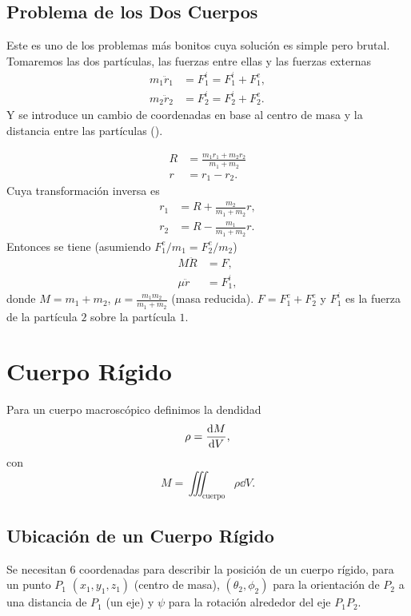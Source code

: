 \section{Problema de los Dos Cuerpos}
Este es uno de los problemas más bonitos cuya solución es simple pero brutal. Tomaremos las dos partículas, las fuerzas entre ellas y las fuerzas externas
\begin{align*}
    m_1 \ddot{r} _1 &= F_1 ^i = F_1 ^i + F_1 ^e, \\
    m_2 \ddot{r} _2 &= F_2 ^i = F_2 ^i + F_2 ^e.
\end{align*}
Y se introduce un cambio de coordenadas en base al centro de masa y la distancia entre las partículas ().

\begin{align*}
    R &= \frac{m_1 r_1 + m_2 r_2}{m_1 + m_2} \\
    r &= r_1 - r_2.
\end{align*}
Cuya transformación inversa es
\begin{align*}
    r_1 &= R + \frac{m_2}{m_1 + m_2} r, \\
    r_2 &= R - \frac{m_1}{m_1 + m_2} r. 
\end{align*}
Entonces se tiene (asumiendo $F_1 ^e /m_1 = F_2 ^e /m_2$)
\begin{align*}
    M\ddot{R} &= F, \\
    \mu \ddot{r} &= F_1 ^i,
\end{align*}
donde $M = m_1 + m_2$, $\mu = \frac{m_1 m_2}{m_1 + m_2}$ (masa reducida). $F = F_1 ^e + F_2 ^e$ y $F_1 ^i$ es la fuerza de la partícula $2$ sobre la partícula $1$. \\




\chapter{Cuerpo Rígido}
Para un cuerpo macroscópico definimos la dendidad
\begin{equation}
	\rho = \dv{M}{V},
\end{equation}
con
\begin{equation}
	M = \iiint _{\text{cuerpo}} \rho \dd{V}.
\end{equation}

\section{Ubicación de un Cuerpo Rígido}
Se necesitan 6 coordenadas para describir la posición de un cuerpo rígido, para un punto $P_1$ $(x_1,y_1,z_1)$ (centro de masa), $(\theta _2, \phi _2)$ para la orientación de $P_2$ a una distancia de $P_1$ (un eje) y $\psi$ para la rotación alrededor del eje $P_1 P_2$.


